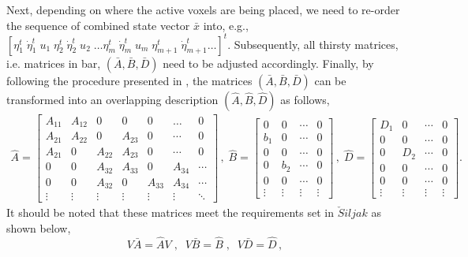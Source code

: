 \documentclass[11pt]{ucthesis}
\begin{document}
Next, depending on where the active voxels are being placed, we need to re-order the sequence of combined state vector $\bar{x}$ into, e.g., $[\eta_{1}^t \; \dot{\eta}_{1}^t \;u_1 \; \eta_{2}^t \; \dot{\eta}_{2}^t \;u_2 \;\ldots \eta_{m}^t \; \dot{\eta}_{m}^t \;u_m \;\eta_{m+1}^t \; \dot{\eta}_{m+1}^t \ldots]^t$. Subsequently, all thirsty matrices, i.e. matrices in bar, $(\bar{A}, \bar{B}, \bar{D})$ need to be adjusted accordingly. Finally, by following the procedure presented in \cite{zevcevic2005new,siljak2011decentralized}, the matrices $(\bar{A}, \bar{B}, \bar{D})$ can be transformed into an overlapping description $(\hat{A}, \hat{B}, \hat{D})$ as follows,
\begin{equation}
\begin{matrix}
\hat{A} =\left [
\begin{array}{cc|cc|cc|c}
A_{11}&A_{12}&0&0&0&\dots&0\\A_{21}&A_{22}&0&A_{23}&0&\cdots&0\\\hline A_{21}&0& A_{22}&A_{23}& 0&\cdots&0\\0&0&A_{32}&A_{33}&0&A_{34}&\cdots\\\hline0&0&A_{32}&0&A_{33}&A_{34} &\cdots\\\vdots&\vdots&\vdots&\vdots&\vdots&\vdots&\ddots
\end{array}\right ]\,,\; 
\hat{B} = \left [\begin{array}{c|c|c|c}
0&0&\cdots&0\\
b_{1} &0&\cdots&0\\\hline 0&0&\cdots&0\\0&b_{2}&\cdots&0\\\hline 0&0&\cdots&0 \\
\vdots & \vdots & \vdots & \vdots
\end{array}\right ]\,,\;
\hat{D} = \left [\begin{array}{c|c|c|c}
D_{1}&0&\cdots&0\\
0&0&\cdots&0\\\hline 0&D_{2}&\cdots&0\\0&0&\cdots&0\\\hline 0&0&\cdots&0 \\
\vdots & \vdots & \vdots & \vdots
\end{array}\right ] .
\end{matrix}
\label{eqn:hatM}
\end{equation}
It should be noted that these matrices meet the requirements set in $\check{S}iljak$ \cite{siljak2011decentralized} as shown below,
\begin{equation}
V \bar{A} = \hat{A}V \;,\;\; V \bar{B} = \hat{B}\;,\;\;V \bar{D} = \hat{D}\,,
\end{equation}
\end{document}

